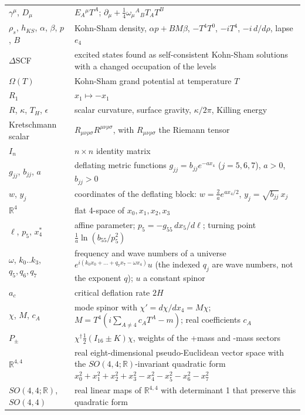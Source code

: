 \documentclass[10pt]{article}
\begin{document}
{\begin{longtable}{>{\raggedright\arraybackslash}p{}>{\raggedright\arraybackslash}p{}}
$\gamma^\mu$, $D_\mu$ & $E_A{}^\mu T^A$; $\partial_\mu + \frac14\omega_\mu{}^A{}_BT_AT^B$ \\
$\rho_s$, $h_{KS}$, $\alpha$, $\beta$, $p$, $B$ & Kohn-Sham density, $\alpha p + BM\beta$, $-T^4T^0$, $-iT^4$, $-i\,d/d\rho$, lapse $e_4$ \\
$\Delta$SCF & excited states found as self-consistent Kohn-Sham solutions with a changed occupation of the levels \\
$\Omega(T)$ & Kohn-Sham grand potential at temperature $T$ \\
$R_1$ & $x_1\mapsto-x_1$ \\
$R$, $\kappa$, $T_H$, $\epsilon$ & scalar curvature, surface gravity, $\kappa/2\pi$, Killing energy \\
Kretschmann scalar & $R_{\mu\nu\rho\sigma}R^{\mu\nu\rho\sigma}$, with $R_{\mu\nu\rho\sigma}$ the Riemann tensor \\
$I_n$ & $n\times n$ identity matrix \\
$g_{jj}$, $b_{jj}$, $a$ & deflating metric functions $g_{jj} = b_{jj}e^{-ax_4}$ ($j = 5, 6, 7$), $a > 0$, $b_{jj} > 0$ \\
$w$, $y_j$ & coordinates of the deflating block: $w = \frac2ae^{ax_4/2}$, $y_j = \sqrt{b_{jj}}\,x_j$ \\
$\mathbb R^4$ & flat 4-space of $x_0, x_1, x_2, x_3$ \\
$\ell$, $p_5$, $x_4^*$ & affine parameter; $p_5 = -g_{55}\,dx_5/d\ell$; turning point $\frac1a\ln(b_{55}/p_5^2)$ \\
$\omega$, $k_0..k_3$, $q_5, q_6, q_7$ & frequency and wave numbers of a universe $e^{i(k_0x_0 + \dots + q_7x_7 - \omega x_4)}u$ (the indexed $q_j$ are wave numbers, not the exponent $q$); $u$ a constant spinor \\
$a_c$ & critical deflation rate $2H$ \\
$\chi$, $M$, $c_A$ & mode spinor with $\chi' = d\chi/dx_4 = M\chi$; $M = T^4(i\sum_{A\ne4}c_AT^A - m)$; real coefficients $c_A$ \\
$P_\pm$ & $\chi^\dagger\frac12(I_{16} \pm K)\chi$, weights of the +mass and -mass sectors \\
$\mathbb R^{4,4}$ & real eight-dimensional pseudo-Euclidean vector space with the $SO(4,4;\mathbb R)$-invariant quadratic form $x_0^2 + x_1^2 + x_2^2 + x_3^2 - x_4^2 - x_5^2 - x_6^2 - x_7^2$ \\
$SO(4,4;\mathbb R)$, $SO(4,4)$ & real linear maps of $\mathbb R^{4,4}$ with determinant 1 that preserve this quadratic form \\

\end{longtable}}
\end{document}
